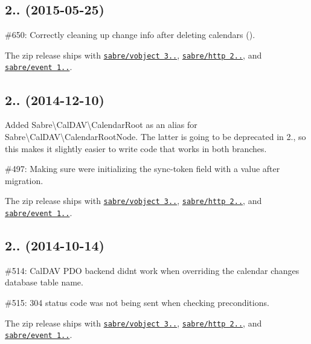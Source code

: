 \subsection*{2.. (2015-\/05-\/25) }


\begin{DoxyItemize}
\item \#650\+: Correctly cleaning up change info after deleting calendars ().
\item The zip release ships with \href{http://sabre.io/vobject/}{\tt sabre/vobject 3..}, \href{http://sabre.io/http/}{\tt sabre/http 2..}, and \href{http://sabre.io/event/}{\tt sabre/event 1..}.
\end{DoxyItemize}

\subsection*{2.. (2014-\/12-\/10) }


\begin{DoxyItemize}
\item Added {\ttfamily Sabre\textbackslash{}Cal\+D\+AV\textbackslash{}Calendar\+Root} as an alias for {\ttfamily Sabre\textbackslash{}Cal\+D\+AV\textbackslash{}Calendar\+Root\+Node}. The latter is going to be deprecated in 2., so this makes it slightly easier to write code that works in both branches.
\item \#497\+: Making sure we\textquotesingle{}re initializing the sync-\/token field with a value after migration.
\item The zip release ships with \href{http://sabre.io/vobject/}{\tt sabre/vobject 3..}, \href{http://sabre.io/http/}{\tt sabre/http 2..}, and \href{http://sabre.io/event/}{\tt sabre/event 1..}.
\end{DoxyItemize}

\subsection*{2.. (2014-\/10-\/14) }


\begin{DoxyItemize}
\item \#514\+: Cal\+D\+AV P\+DO backend didn\textquotesingle{}t work when overriding the \textquotesingle{}calendar changes\textquotesingle{} database table name.
\item \#515\+: 304 status code was not being sent when checking preconditions.
\item The zip release ships with \href{http://sabre.io/vobject/}{\tt sabre/vobject 3..}, \href{http://sabre.io/http/}{\tt sabre/http 2..}, and \href{http://sabre.io/event/}{\tt sabre/event 1..}.
\end{DoxyItemize}

